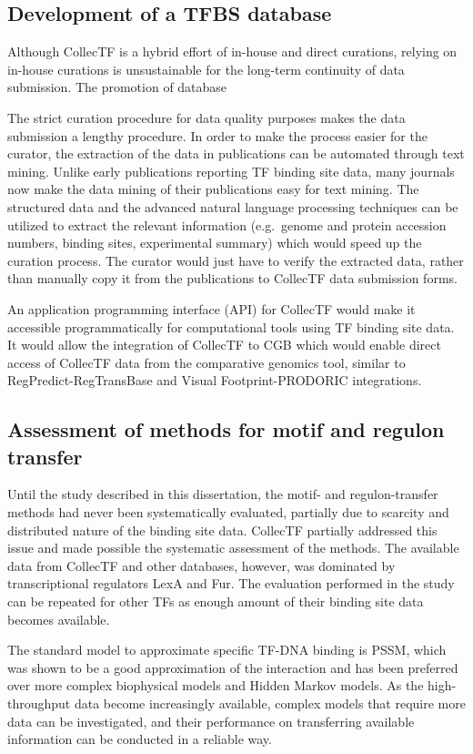 \subsection{Development of a TFBS database}

Although CollecTF is a hybrid effort of in-house and direct curations, relying
on in-house curations is unsustainable for the long-term continuity of data
submission. The promotion of database

The strict curation procedure for data quality purposes makes the data
submission a lengthy procedure. In order to make the process easier for the
curator, the extraction of the data in publications can be automated through
text mining. Unlike early publications reporting TF binding site data, many
journals now make the data mining of their publications easy for text
mining. The structured data and the advanced natural language processing
techniques can be utilized to extract the relevant information (e.g.\ genome
and protein accession numbers, binding sites, experimental summary) which would
speed up the curation process. The curator would just have to verify the
extracted data, rather than manually copy it from the publications to CollecTF
data submission forms.

An application programming interface (API) for CollecTF would make it
accessible programmatically for computational tools using TF binding site
data. It would allow the integration of CollecTF to CGB which would enable
direct access of CollecTF data from the comparative genomics tool, similar to
RegPredict-RegTransBase and Visual Footprint-PRODORIC integrations.

\subsection{Assessment of methods for motif and regulon transfer}

Until the study described in this dissertation, the motif- and regulon-transfer
methods had never been systematically evaluated, partially due to scarcity and
distributed nature of the binding site data. CollecTF partially addressed this
issue and made possible the systematic assessment of the methods. The available
data from CollecTF and other databases, however, was dominated by
transcriptional regulators LexA and Fur. The evaluation performed in the study
can be repeated for other TFs as enough amount of their binding site data
becomes available.

The standard model to approximate specific TF-DNA binding is PSSM, which was
shown to be a good approximation of the interaction and has been preferred over
more complex biophysical models and Hidden Markov models. As the
high-throughput data become increasingly available, complex models that require
more data can be investigated, and their performance on transferring available
information can be conducted in a reliable way.

